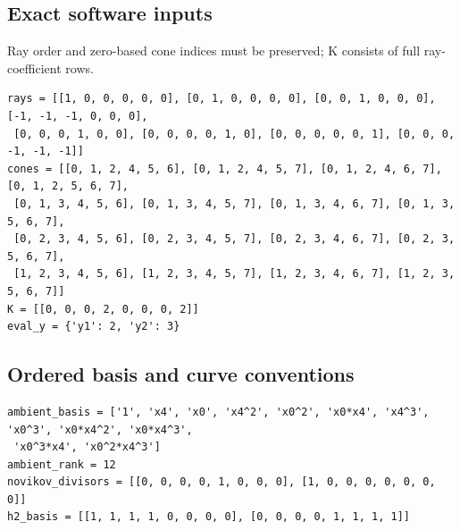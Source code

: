 \documentclass[10pt,a4paper]{article}
\begin{document}
\subsection*{Exact software inputs}
Ray order and zero-based cone indices must be preserved; K consists of full ray-coefficient rows.
\begin{lstlisting}
rays = [[1, 0, 0, 0, 0, 0], [0, 1, 0, 0, 0, 0], [0, 0, 1, 0, 0, 0], [-1, -1, -1, 0, 0, 0],
 [0, 0, 0, 1, 0, 0], [0, 0, 0, 0, 1, 0], [0, 0, 0, 0, 0, 1], [0, 0, 0, -1, -1, -1]]
cones = [[0, 1, 2, 4, 5, 6], [0, 1, 2, 4, 5, 7], [0, 1, 2, 4, 6, 7], [0, 1, 2, 5, 6, 7],
 [0, 1, 3, 4, 5, 6], [0, 1, 3, 4, 5, 7], [0, 1, 3, 4, 6, 7], [0, 1, 3, 5, 6, 7],
 [0, 2, 3, 4, 5, 6], [0, 2, 3, 4, 5, 7], [0, 2, 3, 4, 6, 7], [0, 2, 3, 5, 6, 7],
 [1, 2, 3, 4, 5, 6], [1, 2, 3, 4, 5, 7], [1, 2, 3, 4, 6, 7], [1, 2, 3, 5, 6, 7]]
K = [[0, 0, 0, 2, 0, 0, 0, 2]]
eval_y = {'y1': 2, 'y2': 3}
\end{lstlisting}
\subsection*{Ordered basis and curve conventions}
\begin{lstlisting}
ambient_basis = ['1', 'x4', 'x0', 'x4^2', 'x0^2', 'x0*x4', 'x4^3', 'x0^3', 'x0*x4^2', 'x0*x4^3',
 'x0^3*x4', 'x0^2*x4^3']
ambient_rank = 12
novikov_divisors = [[0, 0, 0, 0, 1, 0, 0, 0], [1, 0, 0, 0, 0, 0, 0, 0]]
h2_basis = [[1, 1, 1, 1, 0, 0, 0, 0], [0, 0, 0, 0, 1, 1, 1, 1]]
\end{lstlisting}
\end{document}
